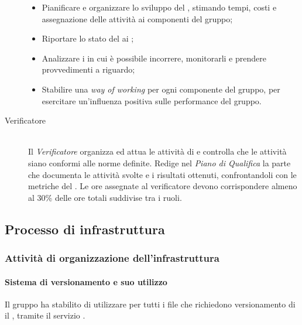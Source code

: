 \begin{description}
\begin{itemize}
  \item Pianificare e organizzare lo sviluppo del , stimando tempi, costi e assegnazione delle attivit\`a ai componenti del gruppo;
  \item Riportare lo stato del  ai ;
  \item Analizzare i  in cui è possibile incorrere, monitorarli e prendere provvedimenti a riguardo;
  \item Stabilire una \textit{way of working} per ogni componente del gruppo, per esercitare un'influenza positiva sulle performance del gruppo.
    
  \end{itemize}

\item[Verificatore] \hfill \\ Il \textit{Verificatore} organizza ed attua le attivit\`a di  e controlla che le attivit\`a siano conformi alle norme definite. Redige nel \textit{Piano di Qualifica} la parte che documenta le attivit\`a svolte e i risultati ottenuti, confrontandoli con le metriche del \PianoDiQualifica. Le ore assegnate al verificatore devono corrispondere almeno al 30\% delle ore totali suddivise tra i ruoli.
  
\end{description}



\subsection{Processo di infrastruttura}

\subsubsection{Attività di organizzazione dell'infrastruttura}

\paragraph*{Sistema di versionamento e suo utilizzo} Il gruppo ha stabilito di utilizzare per tutti i file che richiedono versionamento di il  , tramite il servizio .

